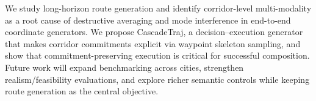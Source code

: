 We study long-horizon route generation and identify corridor-level multi-modality as a root cause of destructive averaging and mode interference in end-to-end coordinate generators.
We propose CascadeTraj, a decision--execution generator that makes corridor commitments explicit via waypoint skeleton sampling, and show that commitment-preserving execution is critical for successful composition.
Future work will expand benchmarking across cities, strengthen realism/feasibility evaluations, and explore richer semantic controls while keeping route generation as the central objective.
